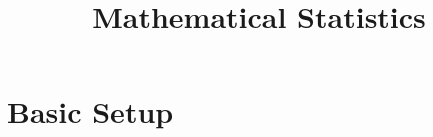 \documentclass[twoside, a4paper, 10pt]{amsart}
\title[ ]{Mathematical Statistics}
\begin{document}
\maketitle
\raggedbottom


\newcommand{\cA}{\mathcal{A}}
\newcommand{\cB}{\mathcal{B}}
\newcommand{\cC}{\mathcal{C}}
\newcommand{\cD}{\mathcal{D}}
\newcommand{\cE}{\mathcal{E}}
\newcommand{\cF}{\mathcal{F}}
\newcommand{\cG}{\mathcal{G}}
\newcommand{\cH}{\mathcal{H}}
\newcommand{\cI}{\mathcal{I}}
\newcommand{\cJ}{\mathcal{J}}
\newcommand{\cK}{\mathcal{K}}
\newcommand{\cL}{\mathcal{L}}
\newcommand{\cM}{\mathcal{M}}
\newcommand{\cN}{\mathcal{N}}
\newcommand{\cO}{\mathcal{O}}
\newcommand{\cP}{\mathcal{P}}
\newcommand{\cQ}{\mathcal{Q}}
\newcommand{\cR}{\mathcal{R}}
\newcommand{\cS}{\mathcal{S}}
\newcommand{\cT}{\mathcal{T}}
\newcommand{\cU}{\mathcal{U}}
\newcommand{\cV}{\mathcal{V}}
\newcommand{\cW}{\mathcal{W}}
\newcommand{\cX}{\mathcal{X}}
\newcommand{\cY}{\mathcal{Y}}
\newcommand{\cZ}{\mathcal{Z}}
\newcommand{\bA}{\mathbb{A}}
\newcommand{\bB}{\mathbb{B}}
\newcommand{\bC}{\mathbb{C}}
\newcommand{\bD}{\mathbb{D}}
\newcommand{\bE}{\mathbb{E}}
\newcommand{\bF}{\mathbb{F}}
\newcommand{\bG}{\mathbb{G}}
\newcommand{\bH}{\mathbb{H}}
\newcommand{\bI}{\mathbb{I}}
\newcommand{\bJ}{\mathbb{J}}
\newcommand{\bK}{\mathbb{K}}
\newcommand{\bL}{\mathbb{L}}
\newcommand{\bM}{\mathbb{M}}
\newcommand{\bN}{\mathbb{N}}
\newcommand{\bO}{\mathbb{O}}
\newcommand{\bP}{\mathbb{P}}
\newcommand{\bQ}{\mathbb{Q}}
\newcommand{\bR}{\mathbb{R}}
\newcommand{\bS}{\mathbb{S}}
\newcommand{\bT}{\mathbb{T}}
\newcommand{\bU}{\mathbb{U}}
\newcommand{\bV}{\mathbb{V}}
\newcommand{\bW}{\mathbb{W}}
\newcommand{\bX}{\mathbb{X}}
\newcommand{\bY}{\mathbb{Y}}
\newcommand{\bZ}{\mathbb{Z}}


 

\theoremstyle{definition}
\newtheorem{mydef}[dummy]{Definition}
\newtheorem{prop}[dummy]{Proposition}
\newtheorem{corol}[dummy]{Corollary}
\newtheorem{thm}[dummy]{Theorem}
\newtheorem{lemma}[dummy]{Lemma}
\newtheorem{eg}[dummy]{Example}
\newtheorem{notation}[dummy]{Notation}
\newtheorem{remark}[dummy]{Remark}
\newtheorem{claim}[dummy]{Claim}
\newtheorem{Exercise}[dummy]{Exercise}
\newtheorem{question}[dummy]{Question}
\newtheorem{conjecture}[dummy]{Conjecture}

\section{Basic Setup}
\end{document}
